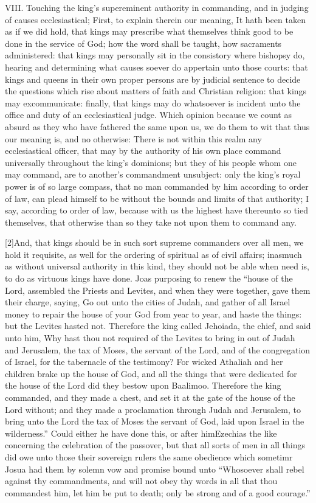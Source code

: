VIII. Touching the king’s supereminent authority in commanding, and in judging of causes ecclesiastical; First, to explain therein our meaning, It hath been taken as if we did hold, that kings may prescribe what themselves think good to be done in the service of God; how the word shall be taught, how sacraments administered: that kings may personally sit in the consistory where bishopsy do, hearing and determining what causes soever do appertain unto those courts: that kings and queens in their own proper persons are by judicial sentence to decide the questions which rise about matters of faith and Christian religion: that kings may excommunicate: finally, that kings may do whatsoever is incident unto the office and duty of an ecclesiastical judge. Which opinion because we count as absurd as they who have fathered the same upon us, we do them to wit that thus our meaning is, and no otherwise: There is not within this realm any ecclesiastical officer, that may by the authority of his own place command universally throughout the king’s dominions; but they of his people whom one may command, are to another’s commandment unsubject: only the king’s royal power is of so large compass, that no man commanded by him according to order of law, can plead himself to be without the bounds and limits of that authority; I say, according to order of law, because with us the highest have thereunto so tied themselves, that otherwise than so they take not upon them to command any.

[2]And, that kings should be in such sort supreme commanders over all men, we hold it requisite, as well for the  ordering of spiritual as of civil affairs; inasmuch as without universal authority in this kind, they should not be able when need is, to do as virtuous kings have done. Joas purposing to renew the “house of the Lord, assembled the Priests and Levites, and when they were together, gave them their charge, saying, Go out unto the cities of Judah, and gather of all Israel money to repair the house of your God from year to year, and haste the things: but the Levites hasted not. Therefore the king called Jehoiada, the chief, and said unto him, Why hast thou not required of the Levites to bring in out of Judah and Jerusalem, the tax of Moses, the servant of the Lord, and of the congregation of Israel, for the tabernacle of the testimony? For wicked Athaliah and her children brake up the house of God, and all the things that were dedicated for the house of the Lord did they bestow upon Baalimoo. Therefore the king commanded, and they made a chest, and set it at the gate of the house of the Lord without; and they made a proclamation through Judah and Jerusalem, to bring unto the Lord the tax of Moses the servant of God, laid upon Israel in the wilderness.” Could either he have done this, or after himEzechias the like concerning the celebration of the passover, but that all sorts of men in all things did owe unto those their sovereign rulers the same obedience which sometimr Josua had them by solemn vow and promise bound unto “Whosoever shall rebel against thy commandments, and will not obey thy words in all that thou commandest him, let him be put to death; only be strong and of a good courage.”

